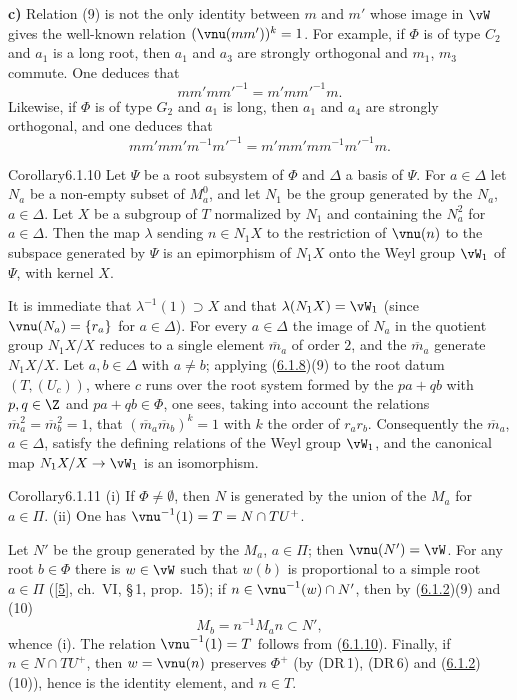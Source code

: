 \documentclass[12pt,a4paper,oneside,english]{smfart}
\makeatletter
\newcommand{\btanchor}[1]{\leavevmode\Hy@raisedlink{\hypertarget{bt:#1}{}}}
\newcommand{\btref}[1]{\hyperlink{bt:#1}{#1}}
\newcommand{\btbib}[1]{\hyperlink{bib:#1}{#1}}
\theoremstyle{definition}
\theoremstyle{bt}
\makeatother
\begin{document}
\medskip
\noindent\textbf{c)} Relation (9) is not the only identity between $m$ and $m'$
whose image in $\vW$ gives the well-known relation $(\vnu(mm'))^{k}=1$. For
example, if $\Phi$ is of type $C_2$ and $a_1$ is a long root, then $a_1$ and
$a_3$ are strongly orthogonal and $m_1$, $m_3$ commute. One deduces that
\[ mm'mm'^{-1}=m'mm'^{-1}m. \]
Likewise, if $\Phi$ is of type $G_2$ and $a_1$ is long, then $a_1$ and $a_4$ are
strongly orthogonal, and one deduces that
\[ mm'mm'm^{-1}m'^{-1}=m'mm'mm^{-1}m'^{-1}m. \]

\begin{stmt}{Corollary}{6.1.10}\btanchor{6.1.10}
Let $\Psi$ be a root subsystem of $\Phi$ and $\Delta$ a basis of $\Psi$. For
$a\in\Delta$ let $N_a$ be a non-empty subset of $M_a^{0}$, and let $N_1$ be the
group generated by the $N_a$, $a\in\Delta$. Let $X$ be a subgroup of $T$
normalized by $N_1$ and containing the $N_a^{2}$ for $a\in\Delta$. Then the map
$\lambda$ sending $n\in N_1X$ to the restriction of $\vnu(n)$ to the subspace
generated by $\Psi$ is an epimorphism of $N_1X$ onto the Weyl group $\vW_1$ of
$\Psi$, with kernel $X$.
\end{stmt}

\begin{sketch}
It is immediate that $\lambda^{-1}(1)\supset X$ and that $\lambda(N_1X)=\vW_1$
(since $\vnu(N_a)=\{r_a\}$ for $a\in\Delta$). For every $a\in\Delta$ the image of
$N_a$ in the quotient group $N_1X/X$ reduces to a single element
$\overline{m}_a$ of order $2$, and the $\overline{m}_a$ generate $N_1X/X$. Let
$a,b\in\Delta$ with $a\ne b$; applying (\btref{6.1.8})(9) to the root datum
$(T,(U_c))$, where $c$ runs over the root system formed by the $pa+qb$ with
$p,q\in\Z$ and $pa+qb\in\Phi$, one sees, taking into account the relations
$\overline{m}_a^{2}=\overline{m}_b^{2}=1$, that
$(\overline{m}_a\overline{m}_b)^{k}=1$ with $k$ the order of $r_ar_b$.
Consequently the $\overline{m}_a$, $a\in\Delta$, satisfy the defining relations
of the Weyl group $\vW_1$, and the canonical map $N_1X/X\to\vW_1$ is an
isomorphism.
\end{sketch}

\begin{stmt}{Corollary}{6.1.11}\btanchor{6.1.11}
{\rm(i)} If $\Phi\ne\emptyset$, then $N$ is generated by the union of the $M_a$
for $a\in\Pi$. {\rm(ii)} One has $\vnu^{-1}(1)=T=N\cap TU^{+}$.
\end{stmt}

\begin{sketch}
Let $N'$ be the group generated by the $M_a$, $a\in\Pi$; then $\vnu(N')=\vW$. For
any root $b\in\Phi$ there is $w\in\vW$ such that $w(b)$ is proportional to a
simple root $a\in\Pi$ ([\btbib{5}], ch.~VI, \S\,1, prop.~15); if
$n\in\vnu^{-1}(w)\cap N'$, then by (\btref{6.1.2})(9) and (10)
\[ M_b=n^{-1}M_an\subset N', \]
whence (i). The relation $\vnu^{-1}(1)=T$ follows from (\btref{6.1.10}). Finally, if
$n\in N\cap TU^{+}$, then $w=\vnu(n)$ preserves $\Phi^{+}$ (by (DR\,1), (DR\,6)
and (\btref{6.1.2})(10)), hence is the identity element, and $n\in T$.
\end{sketch}
\end{document}
